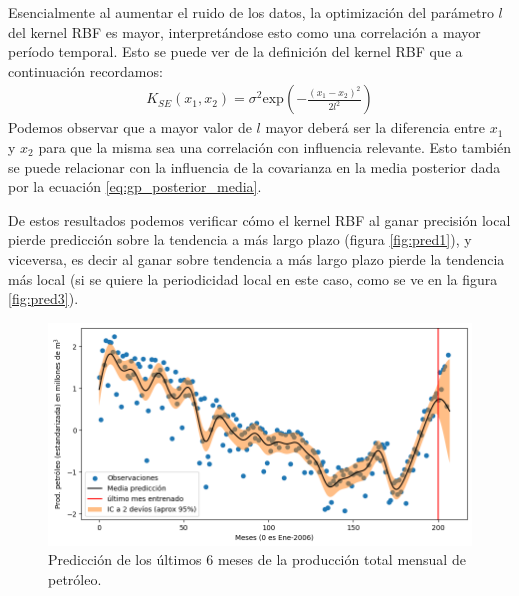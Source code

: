 \documentclass[a4paper]{article}
\begin{document}
Esencialmente al aumentar el ruido de los datos, la optimización del parámetro $l$ del kernel RBF es mayor, interpretándose esto como una correlación a mayor período temporal. Esto se puede ver de la definición del kernel RBF que a continuación recordamos:
\begin{align}
	K_{SE}(x_1,x_2) = \sigma^2 \text{exp}\left(-\frac{(x_1-x_2)^2}{2l^2}\right) %
\end{align} 
Podemos observar que a mayor valor de $l$ mayor deberá ser la diferencia entre $x_1$ y $x_2$ para que la misma sea una correlación con influencia relevante. Esto también se puede relacionar con la influencia de la covarianza en la media posterior dada por la ecuación \ref{eq:gp_posterior_media}.


De estos resultados podemos verificar cómo el kernel RBF al ganar precisión local pierde predicción sobre la tendencia a más largo plazo (figura \ref{fig:pred1}), y viceversa, es decir al ganar sobre tendencia a más largo plazo pierde la tendencia más local (si se quiere la periodicidad local en este caso, como se ve en la figura \ref{fig:pred3}).




\begin{figure}[H]
	\centering
	\includegraphics[trim={0cm 0cm 0cm 0cm},clip,width=.9\textwidth]{pred2.png}
	\caption{Predicción de los últimos 6 meses de la producción total mensual de petróleo.}
	\label{fig:pred2}
\end{figure}
\end{document}

